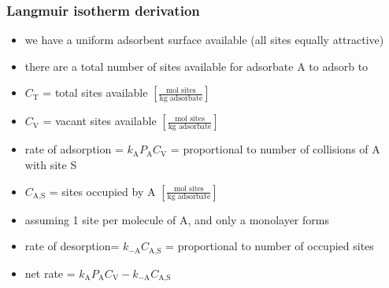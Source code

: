 \begin{frame}\frametitle{Langmuir isotherm derivation}
	\begin{itemize}
		\item	we have a uniform adsorbent surface available {\tiny (all sites equally attractive)}
		\item	there are a total number of sites available for adsorbate A to adsorb to
		\item	$C_\text{T}$ = total sites available \hfill {\scriptsize $\left[\displaystyle\frac{\text{mol sites}}{\text{kg adsorbate}} \right]$}
		\pause
		\item	$C_\text{V}$ = vacant sites available \hfill {\scriptsize $\left[\displaystyle\frac{\text{mol sites}}{\text{kg adsorbate}} \right]$}
		\item	rate of adsorption = $k_\text{A} P_\text{A} C_\text{V}$ = proportional to number of collisions of A with site S
		\pause
		\item	$C_\text{A,S}$ = sites occupied by A \hfill {\scriptsize $\left[\displaystyle\frac{\text{mol sites}}{\text{kg adsorbate}} \right]$}
		\item	assuming 1 site per molecule of A, and only a monolayer forms
		\item	rate of desorption=  $k_{-\text{A}} C_\text{A,S}$ = proportional to number of occupied sites
		\item	net rate = $k_\text{A} P_\text{A} C_\text{V} - k_{-\text{A}} C_\text{A,S}$  
	\end{itemize}
\end{frame}
